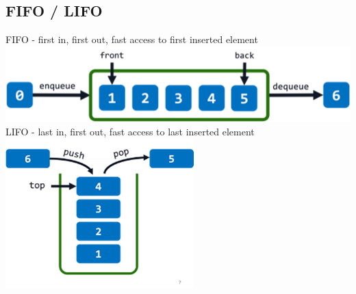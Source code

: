\subsection{FIFO / LIFO}
    FIFO - first in, first out, fast access to first inserted element
    \includegraphics[width = 0.8\linewidth]{src/4_data_structure/images/fifo.png}\\
    LIFO - last in, first out, fast access to last inserted element
    \includegraphics[width = 0.5\linewidth]{src/4_data_structure/images/lifo.png}